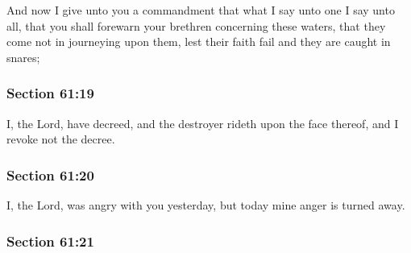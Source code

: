 		And now I give unto you a commandment that what I say unto one I say unto all, that you shall forewarn your brethren concerning these waters, that they come not in journeying upon them, lest their faith fail and they are caught in snares;


	\subsubsection{Section 61:19} %
		\label{DC61-19}

		I, the Lord, have decreed, and the destroyer rideth upon the face thereof, and I revoke not the decree.


	\subsubsection{Section 61:20} %
		\label{DC61-20}

		I, the Lord, was angry with you yesterday, but today mine anger is turned away.


	\subsubsection{Section 61:21} %
		\label{DC61-21}

